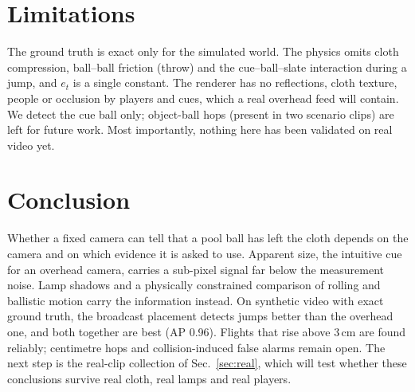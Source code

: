 \documentclass[11pt]{article}
\begin{document}
\section{Limitations}
The ground truth is exact only for the simulated world. The physics omits
cloth compression, ball--ball friction (throw) and the cue--ball--slate
interaction during a jump, and $e_t$ is a single constant. The renderer has
no reflections, cloth texture, people or occlusion by players and cues, which a
real overhead feed will contain. We detect the cue ball only; object-ball
hops (present in two scenario clips) are left for future work. Most
importantly, nothing here has been validated on real video yet.

\section{Conclusion}
Whether a fixed camera can tell that a pool ball has left the cloth depends
on the camera and on which evidence it is asked to use. Apparent size, the
intuitive cue for an overhead camera, carries a sub-pixel signal far below the
measurement noise. Lamp shadows and a physically constrained comparison of
rolling and ballistic motion carry the information instead. On synthetic video
with exact ground truth, the broadcast placement detects jumps better than the
overhead one, and both together are best (AP 0.96). Flights that rise above
3\,cm are found reliably; centimetre hops and collision-induced false alarms
remain open. The next step is the real-clip collection of
Sec.~\ref{sec:real}, which will test whether these conclusions survive real
cloth, real lamps and real players.



\end{document}
